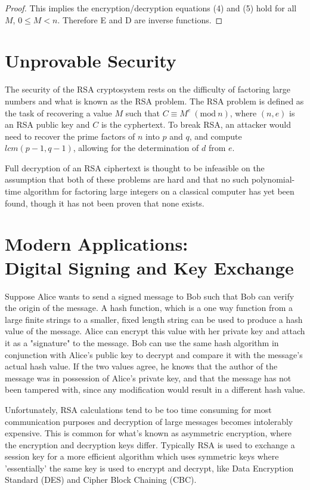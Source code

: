 \documentclass[12pt]{article}
\newcommand{\Mod}[1]{\ (\text{mod}\ #1)}
\begin{document}
\begin{multicols}{2}
\begin{proof}
This implies the encryption/decryption equations (4) and (5) hold for all $M$, $0 \leq M < n$. Therefore E and D are inverse functions.
\end{proof}

\maketitle
\section*{Unprovable Security}

The security of the RSA cryptosystem rests on the difficulty of factoring large numbers and what is known as the RSA problem. The RSA problem is defined as the task of recovering a value $M$ such that $C \equiv M^e \Mod{n}$, where $(n, e)$ is an RSA public key and $C$ is the cyphertext. To break RSA, an attacker would need to recover the prime factors of $n$ into $p$ and $q$, and compute $lcm(p - 1, q - 1)$, allowing for the determination of $d$ from $e$.

Full decryption of an RSA ciphertext is thought to be infeasible on the assumption that both of these problems are hard and that no such polynomial-time algorithm for factoring large integers on a classical computer has yet been found, though it has not been proven that none exists.

\maketitle
\section*{Modern Applications: \\ \large Digital Signing and Key Exchange}

Suppose Alice wants to send a signed message to Bob such that Bob can verify the origin of the message. A hash function, which is a one way function from a large finite strings to a smaller, fixed length string can be used to produce a hash value of the message. Alice can encrypt this value with her private key and attach it as a "signature" to the message. Bob can use the same hash algorithm in conjunction with Alice's public key to decrypt and compare it with the message's actual hash value. If the two values agree, he knows that the author of the message was in possession of Alice's private key, and that the message has not been tampered with, since any modification would result in a different hash value.

Unfortunately, RSA calculations tend to be too time consuming for most communication purposes and decryption of large messages becomes intolerably expensive. This is common for what's known as asymmetric encryption, where the encryption and decryption keys differ. Typically RSA is used to exchange a session key for a more efficient algorithm which uses symmetric keys where 'essentially' the same key is used to encrypt and decrypt, like Data Encryption Standard (DES) and Cipher Block Chaining (CBC).

\end{multicols}
\end{document}
